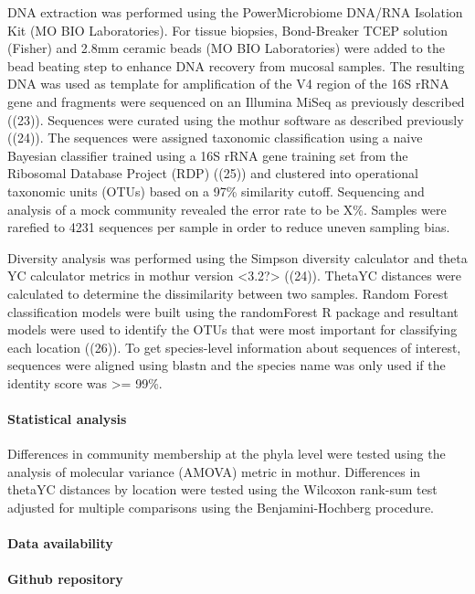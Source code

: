 \documentclass[11pt,]{article}
\let\oldparagraph\paragraph
\renewcommand{\paragraph}[1]{\oldparagraph{#1}\mbox{}}
\begin{document}
DNA extraction was performed using the PowerMicrobiome DNA/RNA Isolation
Kit (MO BIO Laboratories). For tissue biopsies, Bond-Breaker TCEP
solution (Fisher) and 2.8mm ceramic beads (MO BIO Laboratories) were
added to the bead beating step to enhance DNA recovery from mucosal
samples. The resulting DNA was used as template for amplification of the
V4 region of the 16S rRNA gene and fragments were sequenced on an
Illumina MiSeq as previously described ((23)). Sequences were curated
using the mothur software as described previously ((24)). The sequences
were assigned taxonomic classification using a naive Bayesian classifier
trained using a 16S rRNA gene training set from the Ribosomal Database
Project (RDP) ((25)) and clustered into operational taxonomic units
(OTUs) based on a 97\% similarity cutoff. Sequencing and analysis of a
mock community revealed the error rate to be X\%. Samples were rarefied
to 4231 sequences per sample in order to reduce uneven sampling bias.

Diversity analysis was performed using the Simpson diversity calculator
and theta YC calculator metrics in mothur version
\textless{}3.2?\textgreater{} ((24)). ThetaYC distances were calculated
to determine the dissimilarity between two samples. Random Forest
classification models were built using the randomForest R package and
resultant models were used to identify the OTUs that were most important
for classifying each location ((26)). To get species-level information
about sequences of interest, sequences were aligned using blastn and the
species name was only used if the identity score was \textgreater{}=
99\%.

\paragraph{Statistical analysis}\label{statistical-analysis}

Differences in community membership at the phyla level were tested using
the analysis of molecular variance (AMOVA) metric in mothur. Differences
in thetaYC distances by location were tested using the Wilcoxon rank-sum
test adjusted for multiple comparisons using the Benjamini-Hochberg
procedure.

\paragraph{Data availability}\label{data-availability}

\paragraph{Github repository}\label{github-repository}
\end{document}
